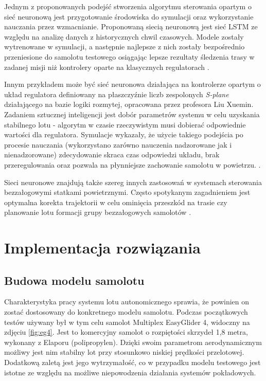 \documentclass[12pt, a4paper]{article}
\begin{document}
Jednym z proponowanych podejść stworzenia algorytmu sterowania opartym o sieć neuronową jest przygotowanie środowiska do symulacji oraz wykorzystanie nauczania przez wzmacnianie. Proponowaną siecią neuronową jest sieć LSTM ze względu na analizę danych z historycznych chwil czasowych. Modele zostały wytrenowane w symulacji, a następnie najlepsze z nich zostały bezpośrednio przeniesione do samolotu testowego osiągając lepsze rezultaty śledzenia trasy w zadanej misji niż kontrolery oparte na klasycznych regulatorach \cite{glowny}. 

Innym przykładem może być sieć neuronowa działająca na kontrolerze opartym o układ regulatora definiowany na płaszczyźnie liczb zespolonych \textit{S-plane} działającego na bazie logiki rozmytej, opracowana przez profesora Liu Xuemin. Zadaniem sztucznej inteligencji jest dobór parametrów systemu w celu uzyskania stabilnego lotu - algorytm w czasie rzeczywistym musi dobierać odpowiednie wartości dla regulatora. Symulacje wykazały, że użycie takiego podejścia po procesie nauczania (wykorzystano zarówno nauczenia nadzorowane jak i nienadzorowane) zdecydowanie skraca czas odpowiedzi układu, brak przeregulowania oraz pozwala na płynniejsze zachowanie samolotu w powietrzu. \cite{the motion controller}.

Sieci neuronowe znajdują także szereg innych zastosowań w systemach sterowania bezzałogowymi statkami powietrznymi. Często spotykanym zagadnieniem jest optymalna korekta trajektorii w celu ominięcia przeszkód na trasie \cite{learnignbased} czy planowanie lotu  formacji grupy bezzałogowych samolotów \cite{2017IEEE}.

\clearpage
\section{Implementacja rozwiązania}
\subsection{Budowa modelu samolotu}
Charakterystyka pracy systemu lotu autonomicznego sprawia, że powinien  on zostać dostosowany do konkretnego modelu samolotu. Podczas początkowych testów używany był w tym celu samolot Multiplex EasyGlider 4, widoczny na zdjęciu \ref{fig:eg4}. Jest to komercyjny samolot o rozpiętości skrzydeł 1,8 metra, wykonany z Elaporu (polipropylen). Dzięki swoim parametrom aerodynamicznym możliwy jest nim stabilny lot przy stosunkowo niskiej prędkości przelotowej. Dodatkową zaletą jest jego wytrzymałość, co w przypadku modelu testowego jest istotne ze względu na możliwe niepowodzenia działania systemów pokładowych.
\end{document}
